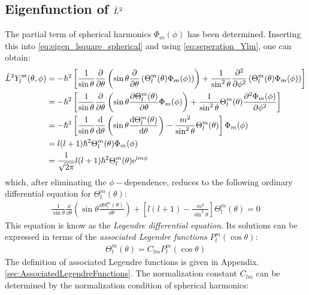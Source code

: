 \subsection{Eigenfunction of \texorpdfstring{$\hat{L}^2$}{L²}}
The partial term of spherical harmonics $\Phi_m(\phi)$ has been determined. Inserting this into \cref{eq:eigen_lsquare_spherical} and using \cref{eq:seperation_Ylm}, one can obtain:
\begin{align}
    \hat{L}^2 Y_l^m (\theta,\phi) &= - \hbar^2 \left[ \frac{1}{\sin \theta} \frac{\partial }{\partial \theta} \left( \sin \theta \frac{\partial }{\partial \theta} \left( \Theta_l^m(\theta) \Phi_m(\phi) \right) \right) + \frac{1}{\sin^2 \theta} \frac{\partial^2}{\partial \phi^2} \left( \Theta_l^m(\theta) \Phi_m(\phi) \right) \right] \notag \\
    &= - \hbar^2 \left[ \frac{1}{\sin \theta} \frac{\partial }{\partial \theta} \left( \sin \theta \frac{\partial \Theta_l^m(\theta)}{\partial \theta} \Phi_m(\phi) \right) + \frac{1}{\sin^2 \theta} \Theta_l^m(\theta)  \frac{\partial^2 \Phi_m(\phi)}{\partial \phi^2}  \right] \notag \\
    &= - \hbar^2 \left[  \frac{1}{\sin \theta}  \frac{\mathrm{d}}{\mathrm{d} \theta} \left( \sin \theta  \frac{\mathrm{d} \Theta_l^m(\theta)}{\mathrm{d} \theta}  \right)  - \frac{m^2}{\sin^2 \theta}  \Theta_l^m(\theta)  \right]  \Phi_m(\phi)  \notag \\
    &= l(l+1) \hbar^2  \Theta_l^m(\theta)  \Phi_m(\phi)  \notag \\
    &=\frac{1}{\sqrt{2 \pi}}  l(l+1) \hbar^2 \Theta_l^m(\theta)  \mathrm{e}^{\mathrm{i} m \phi} \label{eq:theta_equation_intermediate}
\end{align}
which, after eliminating the $\phi-$dependence, reduces to the following ordinary differential equation for $\Theta_l^m(\theta)$:
\begin{align}
    \frac{1}{\sin \theta}  \frac{\dd}{\dd \theta} \left( \sin \theta  \frac{\dd \Theta_l^m(\theta)}{\dd \theta}  \right)  + \left[ l(l+1) - \frac{m^2}{\sin^2 \theta} \right]  \Theta_l^m(\theta) = 0 \label{eq:theta_equation}
\end{align}
This equation is know as the \emph{Legendre differential equation}. Its solutions can be expressed in terms of the \emph{associated Legendre functions} $P_l^m(\cos \theta)$:
\begin{align}
    \Theta_l^m(\theta) = C_{lm} P_l^m(\cos \theta) \label{eq:Theta_solution}
\end{align}
The definition of associated Legendre functions is given in Appendix. \ref{sec:AssociatedLegendreFunctions}. The normalization constant $C_{lm}$ can be determined by the normalization condition of spherical harmonics:
